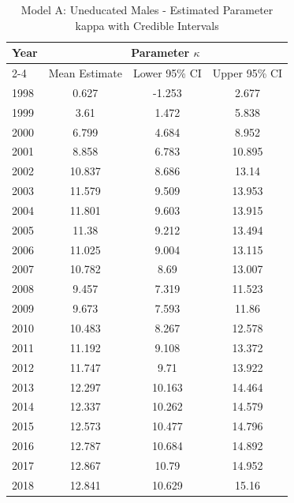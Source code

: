 \begin{landscape}
\begin{table}[htbp]
\centering
\caption{Model A: Uneducated Males - Estimated Parameter kappa  with Credible Intervals}
\label{tab:parameters_k5}
\begin{tabular}{@{}lccc@{}}
\toprule
Year & \multicolumn{3}{c}{Parameter \(\kappa\)} \\
\cmidrule(lr){2-4}
      & Mean Estimate & Lower 95\% CI & Upper 95\% CI \\
\midrule
1998 & 0.627 & -1.253 & 2.677 \\
1999 & 3.61 & 1.472 & 5.838 \\
2000 & 6.799 & 4.684 & 8.952 \\
2001 & 8.858 & 6.783 & 10.895 \\
2002 & 10.837 & 8.686 & 13.14 \\
2003 & 11.579 & 9.509 & 13.953 \\
2004 & 11.801 & 9.603 & 13.915 \\
2005 & 11.38 & 9.212 & 13.494 \\
2006 & 11.025 & 9.004 & 13.115 \\
2007 & 10.782 & 8.69 & 13.007 \\
2008 & 9.457 & 7.319 & 11.523 \\
2009 & 9.673 & 7.593 & 11.86 \\
2010 & 10.483 & 8.267 & 12.578 \\
2011 & 11.192 & 9.108 & 13.372 \\
2012 & 11.747 & 9.71 & 13.922 \\
2013 & 12.297 & 10.163 & 14.464 \\
2014 & 12.337 & 10.262 & 14.579 \\
2015 & 12.573 & 10.477 & 14.796 \\
2016 & 12.787 & 10.684 & 14.892 \\
2017 & 12.867 & 10.79 & 14.952 \\
2018 & 12.841 & 10.629 & 15.16 \\
\bottomrule
\end{tabular}
\end{table}
\end{landscape}